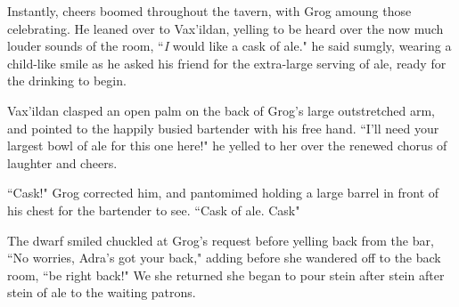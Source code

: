 Instantly, cheers boomed throughout the tavern, with Grog amoung those celebrating. He leaned over to Vax'ildan, yelling to be heard over the now much louder sounds of the room, ``\textit{I} would like a cask of ale." he said sumgly, wearing a child-like smile as he asked his friend for the extra-large serving of ale, ready for the drinking to begin. 

Vax'ildan clasped an open palm on the back of Grog's large outstretched arm, and pointed to the happily busied bartender with his free hand. ``I'll need your largest bowl of ale for this one here!" he yelled to her over the renewed chorus of laughter and cheers.

``Cask!" Grog corrected him, and pantomimed holding a large barrel in front of his chest for the bartender to see. ``Cask of ale. Cask"

The dwarf smiled chuckled at Grog's request before yelling back from the bar, ``No worries, Adra's got your back," adding before she wandered off to the back room, ``be right back!" We she returned she began to pour stein after stein after stein of ale to the waiting patrons.

\newpage

